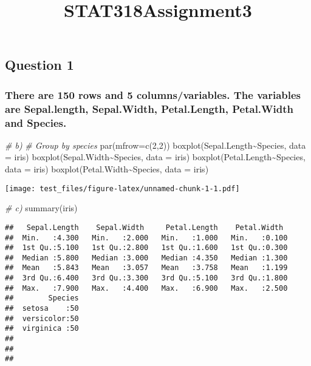 \documentclass[
]{article}
\title{STAT318Assignment3}
\author{}
\date{\vspace{-2.5em}}
\newenvironment{Shaded}{\begin{snugshade}}{\end{snugshade}}
\newcommand{\AttributeTok}[1]{\textcolor[rgb]{0.77,0.63,0.00}{#1}}
\newcommand{\CommentTok}[1]{\textcolor[rgb]{0.56,0.35,0.01}{\textit{#1}}}
\newcommand{\DecValTok}[1]{\textcolor[rgb]{0.00,0.00,0.81}{#1}}
\newcommand{\FunctionTok}[1]{\textcolor[rgb]{0.00,0.00,0.00}{#1}}
\newcommand{\NormalTok}[1]{#1}
\newcommand{\SpecialCharTok}[1]{\textcolor[rgb]{0.00,0.00,0.00}{#1}}
\begin{document}
\maketitle

\hypertarget{question-1}{%
\subsection{\texorpdfstring{\textbf{Question
1}}{Question 1}}\label{question-1}}

\hypertarget{there-are-150-rows-and-5-columnsvariables.-the-variables-are-sepal.length-sepal.width-petal.length-petal.width-and-species.}{%
\subsubsection{There are 150 rows and 5 columns/variables. The variables
are Sepal.length, Sepal.Width, Petal.Length, Petal.Width and
Species.}\label{there-are-150-rows-and-5-columnsvariables.-the-variables-are-sepal.length-sepal.width-petal.length-petal.width-and-species.}}

\begin{Shaded}
\begin{Highlighting}[]
\CommentTok{\# b)}
\CommentTok{\# Group by species}
\FunctionTok{par}\NormalTok{(}\AttributeTok{mfrow=}\FunctionTok{c}\NormalTok{(}\DecValTok{2}\NormalTok{,}\DecValTok{2}\NormalTok{))}
\FunctionTok{boxplot}\NormalTok{(Sepal.Length}\SpecialCharTok{\textasciitilde{}}\NormalTok{Species, }\AttributeTok{data =}\NormalTok{ iris)}
\FunctionTok{boxplot}\NormalTok{(Sepal.Width}\SpecialCharTok{\textasciitilde{}}\NormalTok{Species, }\AttributeTok{data =}\NormalTok{ iris)}
\FunctionTok{boxplot}\NormalTok{(Petal.Length}\SpecialCharTok{\textasciitilde{}}\NormalTok{Species, }\AttributeTok{data =}\NormalTok{ iris)}
\FunctionTok{boxplot}\NormalTok{(Petal.Width}\SpecialCharTok{\textasciitilde{}}\NormalTok{Species, }\AttributeTok{data =}\NormalTok{ iris)}
\end{Highlighting}
\end{Shaded}

\texttt{[image: test\_files/figure-latex/unnamed-chunk-1-1.pdf]}

\begin{Shaded}
\begin{Highlighting}[]
\CommentTok{\# c)}
\FunctionTok{summary}\NormalTok{(iris)}
\end{Highlighting}
\end{Shaded}

\begin{verbatim}
##   Sepal.Length    Sepal.Width     Petal.Length    Petal.Width   
##  Min.   :4.300   Min.   :2.000   Min.   :1.000   Min.   :0.100  
##  1st Qu.:5.100   1st Qu.:2.800   1st Qu.:1.600   1st Qu.:0.300  
##  Median :5.800   Median :3.000   Median :4.350   Median :1.300  
##  Mean   :5.843   Mean   :3.057   Mean   :3.758   Mean   :1.199  
##  3rd Qu.:6.400   3rd Qu.:3.300   3rd Qu.:5.100   3rd Qu.:1.800  
##  Max.   :7.900   Max.   :4.400   Max.   :6.900   Max.   :2.500  
##        Species  
##  setosa    :50  
##  versicolor:50  
##  virginica :50  
##                 
##                 
## 
\end{verbatim}
\end{document}
